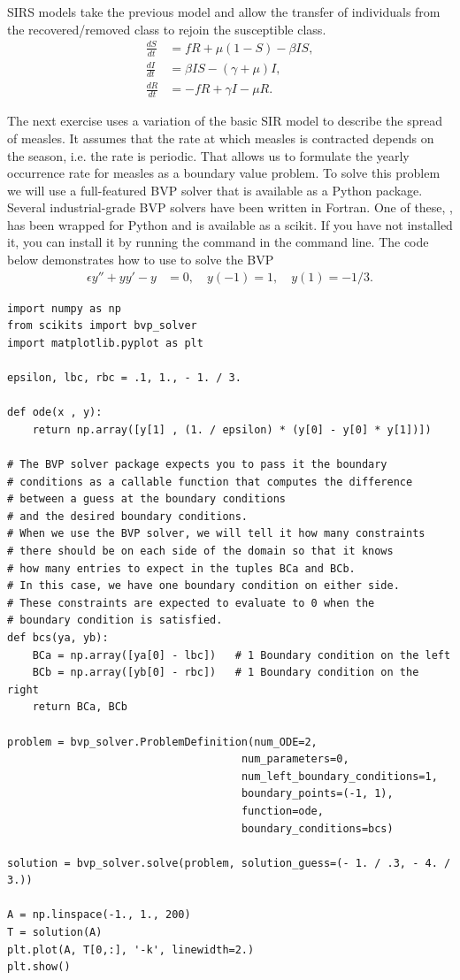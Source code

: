 SIRS models take the previous model and allow the transfer of individuals from the recovered/removed class to rejoin the susceptible class.
\begin{align*}
\frac{dS}{dt} &= fR + \mu(1 -S) - \beta I S,\\
\frac{dI}{dt} &= \beta I S - (\gamma + \mu)I, \\
\frac{dR}{dt} &= -fR + \gamma I - \mu R.
\end{align*}

The next exercise uses a variation of the basic SIR model to describe the spread of measles.
It assumes that the rate at which measles is contracted depends on the season, i.e. the rate is periodic.
That allows us to formulate the yearly occurrence rate for measles as a boundary value problem.
To solve this problem we will use a full-featured BVP solver that is available as a Python package.
Several industrial-grade BVP solvers have been written in Fortran.
One of these, , has been wrapped for Python and is available as a scikit.
If you have not installed it, you can install it by running the command  in the command line.
The code below demonstrates how to use  to solve the BVP
\begin{align*}
	\epsilon y'' + yy' - y &= 0, \quad y(-1) = 1, \quad y(1) = -1/3.
\end{align*}

\begin{lstlisting}
import numpy as np
from scikits import bvp_solver
import matplotlib.pyplot as plt

epsilon, lbc, rbc = .1, 1., - 1. / 3.

def ode(x , y):
    return np.array([y[1] , (1. / epsilon) * (y[0] - y[0] * y[1])])

# The BVP solver package expects you to pass it the boundary
# conditions as a callable function that computes the difference
# between a guess at the boundary conditions
# and the desired boundary conditions.
# When we use the BVP solver, we will tell it how many constraints
# there should be on each side of the domain so that it knows
# how many entries to expect in the tuples BCa and BCb.
# In this case, we have one boundary condition on either side.
# These constraints are expected to evaluate to 0 when the
# boundary condition is satisfied.
def bcs(ya, yb):
    BCa = np.array([ya[0] - lbc])   # 1 Boundary condition on the left
    BCb = np.array([yb[0] - rbc])   # 1 Boundary condition on the right
    return BCa, BCb

problem = bvp_solver.ProblemDefinition(num_ODE=2,
                                     num_parameters=0,
                                     num_left_boundary_conditions=1,
                                     boundary_points=(-1, 1),
                                     function=ode,
                                     boundary_conditions=bcs)

solution = bvp_solver.solve(problem, solution_guess=(- 1. / .3, - 4. / 3.))

A = np.linspace(-1., 1., 200)
T = solution(A)
plt.plot(A, T[0,:], '-k', linewidth=2.)
plt.show()
\end{lstlisting}

